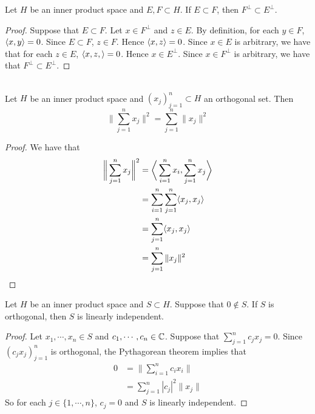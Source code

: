 \documentclass{book}
\begin{document}
\begin{ex}
	Let $H$ be an inner product space and $E,F \subset H$. If $E \subset F$, then $F^{\perp} \subset E^{\perp}$.
\end{ex}

\begin{proof}
	Suppose that $E \subset F$. Let $x \in F^{\perp}$ and $z \in E$. By definition, for each $y \in F$, $\langle x, y\rangle = 0$. Since $E \subset F$, $z \in F$. Hence $\langle x, z \rangle = 0$. Since $x \in E$ is arbitrary, we have that for each $z \in E$, $\langle x, z, \rangle = 0$. Hence $x \in E^{\perp}$. Since $x \in F^{\perp}$ is arbitrary, we have that $F^{\perp} \subset E^{\perp}$. 
\end{proof}

\begin{ex} \lex{}\\
	Let $H$ be an inner product space and $(x_j)_{j =1}^n \subset H$ an orthogonal set. Then $$\bigg \|\sum\limits_{j = 1}^n x_j  \bigg \|^2 = \sum\limits_{j =1}^n \|x_j \|^2$$
\end{ex}

\begin{proof}
	We have that
	\begin{align*}
		\bigg \| \sum\limits_{j = 1}^n  x_j\bigg \|^2
		&= \bigg \langle \sum\limits_{i =1}^n x_i , \sum\limits_{j =1}^n x_j \bigg \rangle \\
		&= \sum\limits_{i =1}^n \sum\limits_{j =1}^n \langle x_j , x_j \rangle \\
		&= \sum\limits_{j =1}^n \langle x_j , x_j \rangle \\
		&= \sum\limits_{j =1}^n \| x_j \|^2
	\end{align*}
\end{proof}

\begin{ex} \lex{}
	Let $H$ be an inner product space and $S \subset H$. Suppose that $0 \not \in S$. If $S$ is orthogonal, then $S$ is linearly independent.
\end{ex}

\begin{proof}
	Let $x_1, \cdots, x_n \in S$ and $c_1, \cdots, c_n \in \mathbb{C}$. Suppose that $\sum\limits_{j =1}^n c_j x_j = 0 $. Since $(c_j x_j)_{j=1}^n$ is orthogonal, the Pythagorean theorem implies that 
	\begin{align*}
		0
		&= \bigg \| \sum_{i=1}^n c_i x_i \bigg \| \\
		&= \sum_{j=1}^n  |c_j|^2 \| x_j\| 
	\end{align*}
	So for each $j \in \{ 1 , \cdots, n\}$, $c_j = 0$ and $S$ is linearly independent.
\end{proof}
\end{document}
